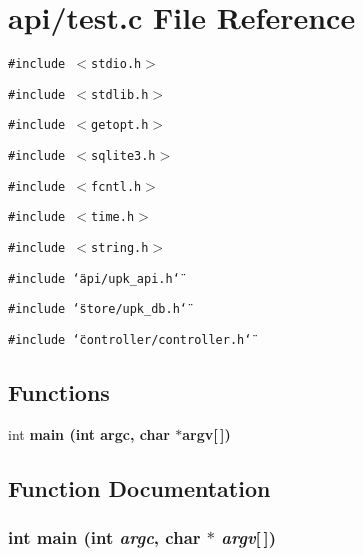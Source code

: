\section{api/test.c File Reference}
\label{api_2test_8c}
{\tt \#include $<$stdio.h$>$}\par
{\tt \#include $<$stdlib.h$>$}\par
{\tt \#include $<$getopt.h$>$}\par
{\tt \#include $<$sqlite3.h$>$}\par
{\tt \#include $<$fcntl.h$>$}\par
{\tt \#include $<$time.h$>$}\par
{\tt \#include $<$string.h$>$}\par
{\tt \#include \char`\"{}api/upk\_\-api.h\char`\"{}}\par
{\tt \#include \char`\"{}store/upk\_\-db.h\char`\"{}}\par
{\tt \#include \char`\"{}controller/controller.h\char`\"{}}\par
\subsection*{Functions}
\begin{CompactItemize}
\item 
int \bf{main} (int argc, char $\ast$argv[$\,$])
\end{CompactItemize}


\subsection{Function Documentation}
\subsubsection{\setlength{\rightskip}{0pt plus 5cm}int main (int {\em argc}, char $\ast$ {\em argv}[$\,$])}\label{api_2test_8c_28052c36c3b61c6c0eaa18f5d226118f}


